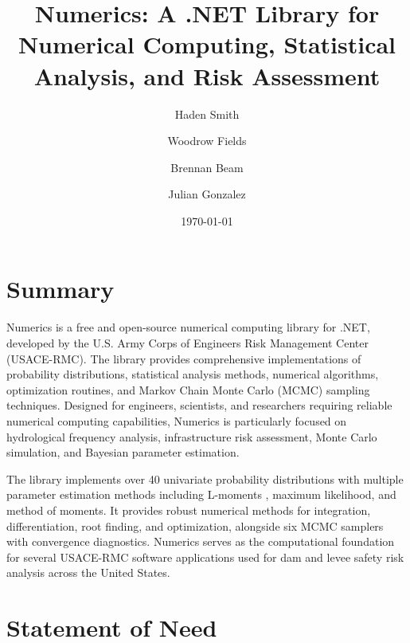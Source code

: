 \documentclass[10pt,a4paper,onecolumn]{article}
\title{Numerics: A .NET Library for Numerical Computing, Statistical Analysis, and Risk Assessment}
\author[1]{Haden Smith}
\author[1]{Woodrow Fields}
\author[1]{Brennan Beam}
\author[1]{Julian Gonzalez}
\affil[1]{U.S. Army Corps of Engineers, Risk Management Center, Lakewood, Colorado, USA}
\date{\today}
\begin{document}
\maketitle


\section*{Summary}

Numerics is a free and open-source numerical computing library for .NET, developed by the U.S. Army Corps of Engineers Risk Management Center (USACE-RMC). The library provides comprehensive implementations of probability distributions, statistical analysis methods, numerical algorithms, optimization routines, and Markov Chain Monte Carlo (MCMC) sampling techniques. Designed for engineers, scientists, and researchers requiring reliable numerical computing capabilities, Numerics is particularly focused on hydrological frequency analysis, infrastructure risk assessment, Monte Carlo simulation, and Bayesian parameter estimation.

The library implements over 40 univariate probability distributions with multiple parameter estimation methods including L-moments \citep{hosking1990}, maximum likelihood, and method of moments. It provides robust numerical methods for integration, differentiation, root finding, and optimization, alongside six MCMC samplers with convergence diagnostics. Numerics serves as the computational foundation for several USACE-RMC software applications used for dam and levee safety risk analysis across the United States.

\section*{Statement of Need}
\end{document}
